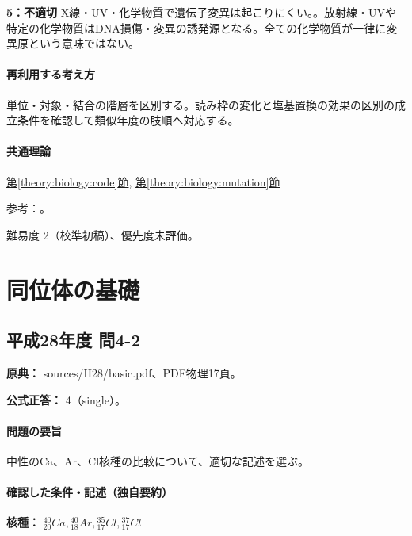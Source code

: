 \noindent\textbf{5：不適切} X線・UV・化学物質で遺伝子変異は起こりにくい。。放射線・UVや特定の化学物質はDNA損傷・変異の誘発源となる。全ての化学物質が一律に変異原という意味ではない。\par

\paragraph{再利用する考え方} 単位・対象・結合の階層を区別する。読み枠の変化と塩基置換の効果の区別の成立条件を確認して類似年度の肢順へ対応する。

\paragraph{共通理論} \hyperref[theory:biology:code]{第\ref*{theory:biology:code}節}, \hyperref[theory:biology:mutation]{第\ref*{theory:biology:mutation}節}

\par 参考：\cite{nhgri_frameshift,nhgri_sickle}。

\par 難易度 2（校準初稿）、優先度未評価。

\section{同位体の基礎}

\subsection{平成28年度 問4-2}
\label{q:h28-reg-basic-4-2}

\noindent\textbf{原典：} sources/H28/basic.pdf、PDF物理17頁。

\textbf{公式正答：} 4（single）。

\paragraph{問題の要旨} 中性のCa、Ar、Cl核種の比較について、適切な記述を選ぶ。

\paragraph{確認した条件・記述（独自要約）}\mbox{}\par

\noindent\textbf{核種：} \({}^{40}_{20}Ca,{}^{40}_{18}Ar,{}^{35}_{17}Cl,{}^{37}_{17}Cl\)\par

